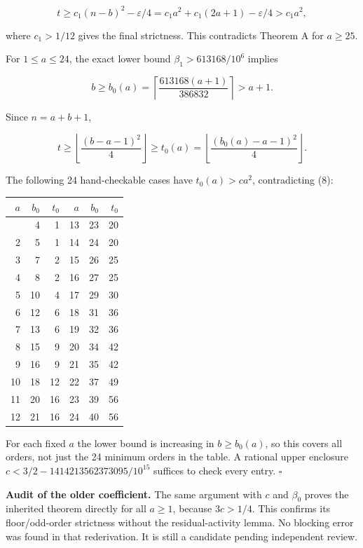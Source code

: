 \documentclass[
  11pt,
  a4paper,
]{article}
\begin{document}
\[t\ge c_1(n-b)^2-\varepsilon/4=c_1a^2+c_1(2a+1)-\varepsilon/4>c_1a^2,\]

where \(c_1>1/12\) gives the final strictness. This contradicts Theorem
A for \(a\ge25\).

For \(1\le a\le24\), the exact lower bound \(\beta_1>613168/10^6\)
implies

\[b\ge b_0(a)=\left\lceil\frac{613168(a+1)}{386832}\right\rceil>a+1.\]

Since \(n=a+b+1\),

\[t\ge\left\lfloor\frac{(b-a-1)^2}{4}\right\rfloor\ge t_0(a)=\left\lfloor\frac{(b_0(a)-a-1)^2}{4}\right\rfloor.\]

The following 24 hand-checkable cases have \(t_0(a)>ca^2\),
contradicting (8):

\begin{longtable}[]{@{}rrrrrr@{}}
\toprule\noalign{}
\(a\) & \(b_0\) & \(t_0\) & \(a\) & \(b_0\) & \(t_0\) \\
\midrule\noalign{}
\endhead
\bottomrule\noalign{}
\endlastfoot
1 & 4 & 1 & 13 & 23 & 20 \\
2 & 5 & 1 & 14 & 24 & 20 \\
3 & 7 & 2 & 15 & 26 & 25 \\
4 & 8 & 2 & 16 & 27 & 25 \\
5 & 10 & 4 & 17 & 29 & 30 \\
6 & 12 & 6 & 18 & 31 & 36 \\
7 & 13 & 6 & 19 & 32 & 36 \\
8 & 15 & 9 & 20 & 34 & 42 \\
9 & 16 & 9 & 21 & 35 & 42 \\
10 & 18 & 12 & 22 & 37 & 49 \\
11 & 20 & 16 & 23 & 39 & 56 \\
12 & 21 & 16 & 24 & 40 & 56 \\
\end{longtable}

For each fixed \(a\) the lower bound is increasing in \(b\ge b_0(a)\),
so this covers all orders, not just the 24 minimum orders in the table.
A rational upper enclosure \(c<3/2-1414213562373095/10^{15}\) suffices
to check every entry. \(\square\)

\textbf{Audit of the older coefficient.} The same argument with \(c\)
and \(\beta_0\) proves the inherited theorem directly for all \(a\ge1\),
because \(3c>1/4\). This confirms its floor/odd-order strictness without
the residual-activity lemma. No blocking error was found in that
rederivation. It is still a candidate pending independent review.
\end{document}

